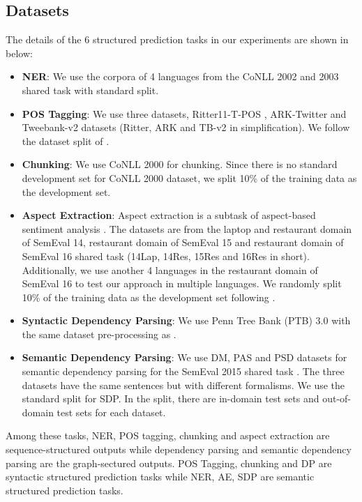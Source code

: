 \documentclass{article} \usepackage{iclr2021_conference,times}
\begin{document}
\subsection{Datasets}
\label{sec:datasets}
The details of the 6 structured prediction tasks in our experiments are shown in below:
\begin{itemize}[leftmargin=*]
    \item {\bf NER}: We use the corpora of 4 languages from the CoNLL 2002 and 2003 shared task \citep{tjong-kim-sang-2002-introduction,tjong-kim-sang-de-meulder-2003-introduction} with standard split.
    \item {\bf POS Tagging}: We use three datasets, Ritter11-T-POS \citep{ritter-etal-2011-named}, ARK-Twitter \citep{gimpel-etal-2011-part,owoputi-etal-2013-improved} and Tweebank-v2 \citep{liu-etal-2018-parsing} datasets (Ritter, ARK and TB-v2 in simplification). We follow the dataset split of \citep{nguyen2020bertweet}.
    \item {\bf Chunking}: We use CoNLL 2000 \citep{tjong-kim-sang-buchholz-2000-introduction} for chunking. Since there is no standard development set for CoNLL 2000 dataset, we split 10\% of the training data as the development set.
    \item {\bf Aspect Extraction}: Aspect extraction is a subtask of aspect-based sentiment analysis \citep{pontiki-etal-2014-semeval,pontiki-etal-2015-semeval,pontiki-etal-2016-semeval}. The datasets are from the laptop and restaurant domain of SemEval 14, restaurant domain of SemEval 15 and restaurant domain of  SemEval 16 shared task (14Lap, 14Res, 15Res and 16Res in short). Additionally, we use another 4 languages in the restaurant domain of SemEval 16 to test our approach in multiple languages. We randomly split 10\% of the training data as the development set following \citet{li-etal-2019-exploiting}.
    \item {\bf Syntactic Dependency Parsing}: We use Penn Tree Bank (PTB) 3.0 with the same dataset pre-processing as \citep{ma-etal-2018-stack}.
    \item {\bf Semantic Dependency Parsing}: We use DM, PAS and PSD datasets for semantic dependency parsing \citep{oepensemeval} for the SemEval 2015 shared task \citep{oepen2015semeval}. The three datasets have the same sentences but with different formalisms. We use the standard split for SDP. In the split, there are in-domain test sets and out-of-domain test sets for each dataset.
\end{itemize}
Among these tasks, NER, POS tagging, chunking and aspect extraction are sequence-structured outputs while dependency parsing and semantic dependency parsing are the graph-sectured outputs. POS Tagging, chunking and DP are syntactic structured prediction tasks while NER, AE, SDP are semantic structured prediction tasks. 
\end{document}
